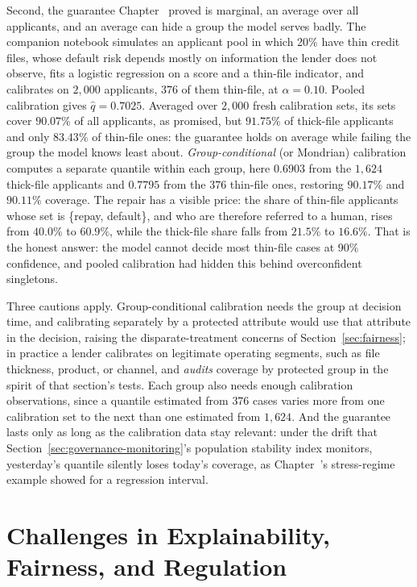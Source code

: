 \documentclass[../ai_in_finance]{subfiles}
\begin{document}
Second, the guarantee Chapter~ proved is marginal, an average over all applicants, and an average can hide a group the model serves badly. The companion notebook simulates an applicant pool in which 20\% have thin credit files, whose default risk depends mostly on information the lender does not observe, fits a logistic regression on a score and a thin-file indicator, and calibrates on $2{,}000$ applicants, $376$ of them thin-file, at $\alpha = 0.10$. Pooled calibration gives $\hat q = 0.7025$. Averaged over $2{,}000$ fresh calibration sets, its sets cover $90.07\%$ of all applicants, as promised, but $91.75\%$ of thick-file applicants and only $83.43\%$ of thin-file ones: the guarantee holds on average while failing the group the model knows least about. \emph{Group-conditional} (or Mondrian) calibration computes a separate quantile within each group, here $0.6903$ from the $1{,}624$ thick-file applicants and $0.7795$ from the $376$ thin-file ones, restoring $90.17\%$ and $90.11\%$ coverage. The repair has a visible price: the share of thin-file applicants whose set is \{repay, default\}, and who are therefore referred to a human, rises from $40.0\%$ to $60.9\%$, while the thick-file share falls from $21.5\%$ to $16.6\%$. That is the honest answer: the model cannot decide most thin-file cases at 90\% confidence, and pooled calibration had hidden this behind overconfident singletons.

Three cautions apply. Group-conditional calibration needs the group at decision time, and calibrating separately by a protected attribute would use that attribute in the decision, raising the disparate-treatment concerns of Section~\ref{sec:fairness}; in practice a lender calibrates on legitimate operating segments, such as file thickness, product, or channel, and \emph{audits} coverage by protected group in the spirit of that section's tests. Each group also needs enough calibration observations, since a quantile estimated from $376$ cases varies more from one calibration set to the next than one estimated from $1{,}624$. And the guarantee lasts only as long as the calibration data stay relevant: under the drift that Section~\ref{sec:governance-monitoring}'s population stability index monitors, yesterday's quantile silently loses today's coverage, as Chapter~'s stress-regime example showed for a regression interval.

\section{Challenges in Explainability, Fairness, and Regulation}
\end{document}
